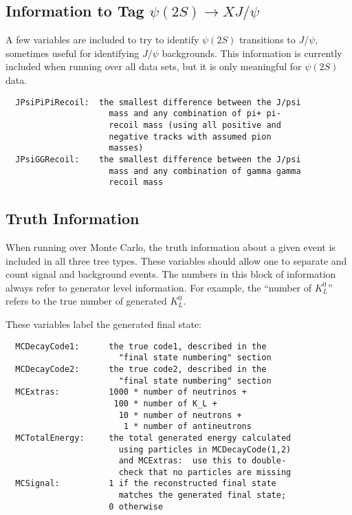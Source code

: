 \documentclass[11pt,a4paper]{define/cepcnote}
\begin{document}
\subsection[Information to Tag $\psi(2S)\to XJ/\psi$]{\boldmath Information to Tag $\psi(2S)\to XJ/\psi$}

A few variables are included to try to identify $\psi(2S)$ transitions to $J/\psi$, 
sometimes useful for identifying $J/\psi$ backgrounds.  
This information is currently included when running over all data sets, but it is only meaningful for $\psi(2S)$ data.

\begin{verbatim}
  JPsiPiPiRecoil:  the smallest difference between the J/psi
                     mass and any combination of pi+ pi-
                     recoil mass (using all positive and
                     negative tracks with assumed pion 
                     masses)
  JPsiGGRecoil:    the smallest difference between the J/psi
                     mass and any combination of gamma gamma
                     recoil mass
\end{verbatim}

\subsection{Truth Information}

When running over Monte Carlo, the truth information about a given event is included in all three tree types.  
These variables should allow one to separate and count signal and background events.  
The numbers in this block of information always refer to generator level information.  
For example, the ``number of $K^0_L$'' refers to the true number of generated $K^0_L$.

These variables label the generated final state:
\begin{verbatim}
  MCDecayCode1:      the true code1, described in the
                       "final state numbering" section
  MCDecayCode2:      the true code2, described in the
                       "final state numbering" section
  MCExtras:          1000 * number of neutrinos +
                      100 * number of K_L +
                       10 * number of neutrons +
                        1 * number of antineutrons
  MCTotalEnergy:     the total generated energy calculated
                       using particles in MCDecayCode(1,2)
                       and MCExtras:  use this to double-
                       check that no particles are missing
  MCSignal:          1 if the reconstructed final state
                       matches the generated final state;
                     0 otherwise
\end{verbatim}
\end{document}
